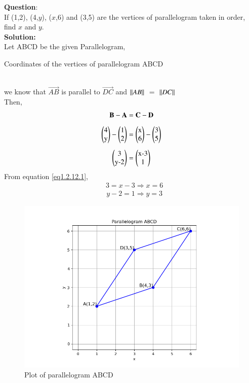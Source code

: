 \documentclass[journal]{IEEEtran}
\begin{document}
\textbf{Question}:\\If (1,2), (4,$y$), ($x$,6) and (3,5) are the vertices of parallelogram taken in order, find $x$ and $y$.
\\ \textbf{Solution:} \\ \hspace {0.5em} Let ABCD be the given Parallelogram, \\ 
\begin{table}[h!]
\centering
    \caption{Coordinates of the vertices of parallelogram ABCD}

\end{table}
 \\ we know that $\vec{AB}$ is parallel to $\vec{DC}$ and  $\left\vert\left\vert AB\right\vert\right\vert$ $=$ $\left\vert\left\vert DC\right\vert\right\vert$ \\ Then,
\begin{align}
	\vec{B}-\vec{A}&=\vec{C}-\vec{D}\\[.5em]
\myvec{4 \\ $y$}-\myvec{1 \\ 2}&=\myvec{$x$ \\ 6}-\myvec{3 \\ 5}\\[0.5em] 
\myvec{3 \\ $y-2$}&=\myvec{$x-3$ \\ 1}\label{eq1.2.12.1} \end{align}
\hspace{8em} From equation\hspace{0.5em} \eqref{eq1.2.12.1}, \begin{align} &3=x-3	\Rightarrow x=6  \end{align} \begin{align} &y-2=1 \Rightarrow y=3\end{align}
\begin{figure}[h!]
   \centering \includegraphics[width=0.7\linewidth]{figs/Figure_1.png}
   \caption{Plot of parallelogram ABCD}
   \label{Parallelogram}
\end{figure}
\end{document}
